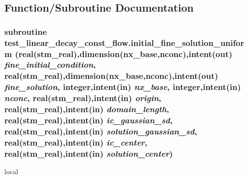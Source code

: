 \subsection{Function/Subroutine Documentation}
\hypertarget{a00088_9525b389ed0fa43aa51ef05fa6c03526}{
\subsubsection[{initial\_\-fine\_\-solution\_\-uniform}]{\setlength{\rightskip}{0pt plus 5cm}subroutine test\_\-linear\_\-decay\_\-const\_\-flow.initial\_\-fine\_\-solution\_\-uniform (real(stm\_\-real),dimension(nx\_\-base,nconc),intent(out) {\em fine\_\-initial\_\-condition}, \/  real(stm\_\-real),dimension(nx\_\-base,nconc),intent(out) {\em fine\_\-solution}, \/  integer,intent(in) {\em nx\_\-base}, \/  integer,intent(in) {\em nconc}, \/  real(stm\_\-real),intent(in) {\em origin}, \/  real(stm\_\-real),intent(in) {\em domain\_\-length}, \/  real(stm\_\-real),intent(in) {\em ic\_\-gaussian\_\-sd}, \/  real(stm\_\-real),intent(in) {\em solution\_\-gaussian\_\-sd}, \/  real(stm\_\-real),intent(in) {\em ic\_\-center}, \/  real(stm\_\-real),intent(in) {\em solution\_\-center})}}
\label{a00088_9525b389ed0fa43aa51ef05fa6c03526}


local 

